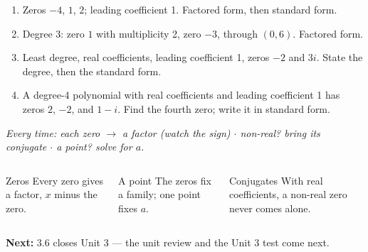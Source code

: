 \documentclass[aspectratio=169, 11pt]{beamer}
\begin{document}
\begin{frame}[t, plain]

  \begin{enumerate}\setlength{\itemsep}{8pt}
    \setcounter{enumi}{14}
    \item Zeros \(-4\), \(1\), \(2\); leading coefficient 1. Factored form, then standard form.
    \item Degree 3: zero \(1\) with multiplicity 2, zero \(-3\), through \((0, 6)\). Factored form.
    \item Least degree, real coefficients, leading coefficient 1, zeros \(-2\) and \(3i\). State
          the degree, then the standard form.
    \item A degree-4 polynomial with real coefficients and leading coefficient 1 has zeros
          \(2\), \(-2\), and \(1 - i\). Find the fourth zero; write it in standard form.
  \end{enumerate}

  \bigskip
  \textit{Every time: each zero \(\to\) a factor (watch the sign) $\cdot$ non-real? bring its
  conjugate $\cdot$ a point? solve for \(a\).}
\end{frame}

\begin{frame}[t, plain]

  \begin{columns}[T]
      \begin{block}{Zeros}
        Every zero gives a factor, \(x\) minus the zero.
      \end{block}
      \begin{block}{A point}
        The zeros fix a family; one point fixes \(a\).
      \end{block}
      \begin{block}{Conjugates}
        With real coefficients, a non-real zero never comes alone.
      \end{block}
  \end{columns}

  \bigskip
  \textbf{Next:} 3.6 closes Unit 3 --- the unit review and the Unit 3 test come next.
\end{frame}
\end{document}
